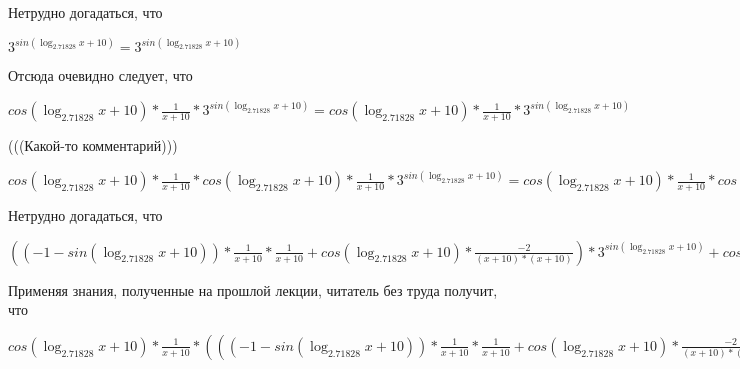 \documentclass[12pt,a4paper,fleqn]{article}
\theoremstyle{definition}
\begin{document}
Нетрудно догадаться, что 

${ 3 }^{sin(\log_{ 2.71828 }{ x  +  10 })} = { 3 }^{sin(\log_{ 2.71828 }{ x  +  10 })}$

Отсюда очевидно следует, что 

$cos(\log_{ 2.71828 }{ x  +  10 }) * \frac{ 1 }{ x  +  10 }
 * { 3 }^{sin(\log_{ 2.71828 }{ x  +  10 })} = cos(\log_{ 2.71828 }{ x  +  10 }) * \frac{ 1 }{ x  +  10 }
 * { 3 }^{sin(\log_{ 2.71828 }{ x  +  10 })}$

(((Какой-то комментарий))) 

$cos(\log_{ 2.71828 }{ x  +  10 }) * \frac{ 1 }{ x  +  10 }
 * cos(\log_{ 2.71828 }{ x  +  10 }) * \frac{ 1 }{ x  +  10 }
 * { 3 }^{sin(\log_{ 2.71828 }{ x  +  10 })} = cos(\log_{ 2.71828 }{ x  +  10 }) * \frac{ 1 }{ x  +  10 }
 * cos(\log_{ 2.71828 }{ x  +  10 }) * \frac{ 1 }{ x  +  10 }
 * { 3 }^{sin(\log_{ 2.71828 }{ x  +  10 })}$

Нетрудно догадаться, что 

$(( -1  - sin(\log_{ 2.71828 }{ x  +  10 })) * \frac{ 1 }{ x  +  10 }
 * \frac{ 1 }{ x  +  10 }
 + cos(\log_{ 2.71828 }{ x  +  10 }) * \frac{ -2 }{( x  +  10 ) * ( x  +  10 )}
) * { 3 }^{sin(\log_{ 2.71828 }{ x  +  10 })} + cos(\log_{ 2.71828 }{ x  +  10 }) * \frac{ 1 }{ x  +  10 }
 * cos(\log_{ 2.71828 }{ x  +  10 }) * \frac{ 1 }{ x  +  10 }
 * { 3 }^{sin(\log_{ 2.71828 }{ x  +  10 })} = (( -1  - sin(\log_{ 2.71828 }{ x  +  10 })) * \frac{ 1 }{ x  +  10 }
 * \frac{ 1 }{ x  +  10 }
 + cos(\log_{ 2.71828 }{ x  +  10 }) * \frac{ -2 }{( x  +  10 ) * ( x  +  10 )}
) * { 3 }^{sin(\log_{ 2.71828 }{ x  +  10 })} + cos(\log_{ 2.71828 }{ x  +  10 }) * \frac{ 1 }{ x  +  10 }
 * cos(\log_{ 2.71828 }{ x  +  10 }) * \frac{ 1 }{ x  +  10 }
 * { 3 }^{sin(\log_{ 2.71828 }{ x  +  10 })}$

Применяя знания, полученные на прошлой лекции, читатель без труда получит, что 

$cos(\log_{ 2.71828 }{ x  +  10 }) * \frac{ 1 }{ x  +  10 }
 * ((( -1  - sin(\log_{ 2.71828 }{ x  +  10 })) * \frac{ 1 }{ x  +  10 }
 * \frac{ 1 }{ x  +  10 }
 + cos(\log_{ 2.71828 }{ x  +  10 }) * \frac{ -2 }{( x  +  10 ) * ( x  +  10 )}
) * { 3 }^{sin(\log_{ 2.71828 }{ x  +  10 })} + cos(\log_{ 2.71828 }{ x  +  10 }) * \frac{ 1 }{ x  +  10 }
 * cos(\log_{ 2.71828 }{ x  +  10 }) * \frac{ 1 }{ x  +  10 }
 * { 3 }^{sin(\log_{ 2.71828 }{ x  +  10 })}) = cos(\log_{ 2.71828 }{ x  +  10 }) * \frac{ 1 }{ x  +  10 }
 * ((( -1  - sin(\log_{ 2.71828 }{ x  +  10 })) * \frac{ 1 }{ x  +  10 }
 * \frac{ 1 }{ x  +  10 }
 + cos(\log_{ 2.71828 }{ x  +  10 }) * \frac{ -2 }{( x  +  10 ) * ( x  +  10 )}
) * { 3 }^{sin(\log_{ 2.71828 }{ x  +  10 })} + cos(\log_{ 2.71828 }{ x  +  10 }) * \frac{ 1 }{ x  +  10 }
 * cos(\log_{ 2.71828 }{ x  +  10 }) * \frac{ 1 }{ x  +  10 }
 * { 3 }^{sin(\log_{ 2.71828 }{ x  +  10 })})$
\end{document}
